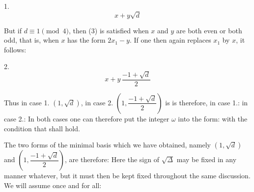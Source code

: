 
1. 
\[
x+y\sqrt{d}
\]

But if $d\equiv 1\pmod 4$, then (3) is satisfied when $x$ and $y$
are both even or both odd, that is, when $x$ has the form
$2x_1-y$. If one then again replaces $x_1$ by $x$, it follows:

2. 
\[
x+y\,\frac{-1+\sqrt{d}}{2}
\]

Thus in case 1. $(1,\sqrt{d})$, in case 2. $\left(1,\dfrac{-1+\sqrt{d}}{2}\right)$
is  is therefore, in case 1.:
in case 2.:
In both cases one can therefore put the integer $\omega$ into the
form:
with the condition that
shall hold.

The two forms of the minimal basis which we have obtained,
namely $(1,\sqrt{d})$ and $\left(1,\dfrac{-1+\sqrt{d}}{2}\right)$, are therefore:
Here the sign of $\sqrt{\varDelta}$ may be fixed in any manner whatever, but it must then be kept fixed throughout the same discussion. We will assume once and for all:
